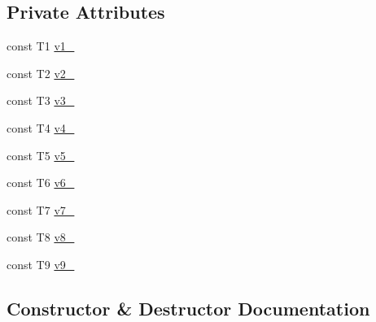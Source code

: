\subsection*{Private Attributes}
\begin{DoxyCompactItemize}
\item 
const T1 \mbox{\hyperlink{classtesting_1_1internal_1_1_value_array9_a92de55b339b0ecbecc999794c66d37e8}{v1\+\_\+}}
\item 
const T2 \mbox{\hyperlink{classtesting_1_1internal_1_1_value_array9_a30fe1d08a464339d29424c25c8cbb4b0}{v2\+\_\+}}
\item 
const T3 \mbox{\hyperlink{classtesting_1_1internal_1_1_value_array9_a4b6d059b497f47f5baa1ae5b94a30d49}{v3\+\_\+}}
\item 
const T4 \mbox{\hyperlink{classtesting_1_1internal_1_1_value_array9_a4f6ae3ac44cfd019b86abb589be87e73}{v4\+\_\+}}
\item 
const T5 \mbox{\hyperlink{classtesting_1_1internal_1_1_value_array9_a38c8c520ae4138237e958e806b1e2a10}{v5\+\_\+}}
\item 
const T6 \mbox{\hyperlink{classtesting_1_1internal_1_1_value_array9_a9c4ac98318a601dee0183ae319c56330}{v6\+\_\+}}
\item 
const T7 \mbox{\hyperlink{classtesting_1_1internal_1_1_value_array9_a261e585b5444794761ab9a190132b85b}{v7\+\_\+}}
\item 
const T8 \mbox{\hyperlink{classtesting_1_1internal_1_1_value_array9_af8e51b462201ee9e11700d7d068f850e}{v8\+\_\+}}
\item 
const T9 \mbox{\hyperlink{classtesting_1_1internal_1_1_value_array9_af3a2a4dd34e40daa035aeb7639399871}{v9\+\_\+}}
\end{DoxyCompactItemize}


\subsection{Constructor \& Destructor Documentation}
\mbox{\label{classtesting_1_1internal_1_1_value_array9_a4985545b509dc5d7db659cd31b110c21}} 
